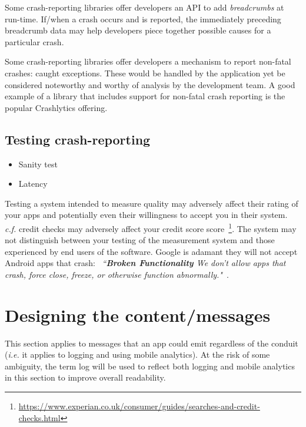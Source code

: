 Some crash-reporting libraries offer developers an API to add \emph{breadcrumbs} at run-time. If/when a crash occurs and is reported, the immediately preceding breadcrumb data may help developers piece together possible causes for a particular crash.

Some crash-reporting libraries offer developers a mechanism to report non-fatal crashes: caught exceptions. These would be handled by the application yet be considered noteworthy and worthy of analysis by the development team. A good example of a library that includes support for non-fatal crash reporting is the popular Crashlytics offering.  

\subsection{Testing crash-reporting}
\begin{itemize}
    \item Sanity test
    \item Latency
\end{itemize}

Testing a system intended to measure quality may adversely affect their rating of your apps and potentially even their willingness to accept you in their system. \emph{c.f.} credit checks may adversely affect your credit score score~\footnote{\url{https://www.experian.co.uk/consumer/guides/searches-and-credit-checks.html}}. The system may not distinguish between your testing of the measurement system and those experienced by end users of the software. Google is adamant they will not accept Android apps that crash: ~\emph{``\textbf{Broken Functionality} We don’t allow apps that crash, force close, freeze, or otherwise function abnormally."}~\cite{google_play_developer_policy_center}.

\section{Designing the content/messages} 
This section applies to messages that an app could emit regardless of the conduit (\emph{i.e.} it applies to logging and using mobile analytics). At the risk of some ambiguity, the term log will be used to reflect both logging and mobile analytics in this section to improve overall readability.

